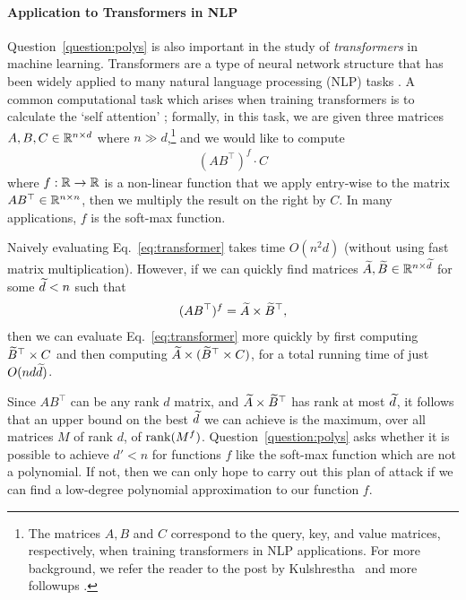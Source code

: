 \paragraph{Application to Transformers in NLP} Question~\ref{question:polys} is also important in the study of \emph{transformers} in machine learning. Transformers are a type of neural network structure that has been widely applied to many natural language processing (NLP) tasks \cite{vsp+17}. A common computational task which arises when training transformers is to calculate the `self attention' \cite{transformers}; formally, in this task, we are given three matrices $ A, B , C \in {\mathbb R}^{n \times d}$ where $n \gg d$,\footnote{The matrices $A, B$ and $C$ correspond to the query, key, and value matrices, respectively, when training transformers in NLP applications. For more background, we refer the reader to the post by Kulshrestha~\cite{transformers} and more followups \cite{kkl19,cld+20,fzs21,wlk+20}.} and we would like to compute
\begin{align}\label{eq:transformer}
    (A  B^\top)^f \cdot C
\end{align}
where $f : {\mathbb R} \rightarrow {\mathbb R}$ is a non-linear function that we apply entry-wise to the matrix $A B^\top \in {\mathbb R}^{n \times n}$, then we multiply the result on the right by $C$. In many applications, $f$ is the soft-max function. %

Naively evaluating Eq.~\eqref{eq:transformer} takes time $O( n^2 d )$ (without using fast matrix multiplication).  
However, if we can quickly find matrices $\widetilde{A}, \widetilde{B} \in {\mathbb R}^{n \times \widetilde{d} }$ for some $\widetilde{d} < n$ such that
\begin{align*}
    (AB^\top)^f = \widetilde{A} \times \widetilde{B}^\top,
\end{align*}
then we can evaluate Eq.~\eqref{eq:transformer} more quickly by first computing $\widetilde{B}^\top \times C$ and then computing $\widetilde{A} \times (\widetilde{B}^\top \times C)$, for a total running time of just $O(n d \widetilde{d})$.

Since $AB^\top$ can be any rank $d$ matrix, and $\widetilde{A} \times \widetilde{B}^\top$ has rank at most $\widetilde{d}$, it follows that an upper bound on the best $\widetilde{d}$ we can achieve is the maximum, over all matrices $M$ of rank $d$, of $\operatorname{rank}(M^f)$. Question~\ref{question:polys} asks whether it is possible to achieve $d' < n$ for functions $f$ like the soft-max function which are not a polynomial. If not, then we can only hope to carry out this plan of attack if we can find a low-degree polynomial approximation to our function $f$.

